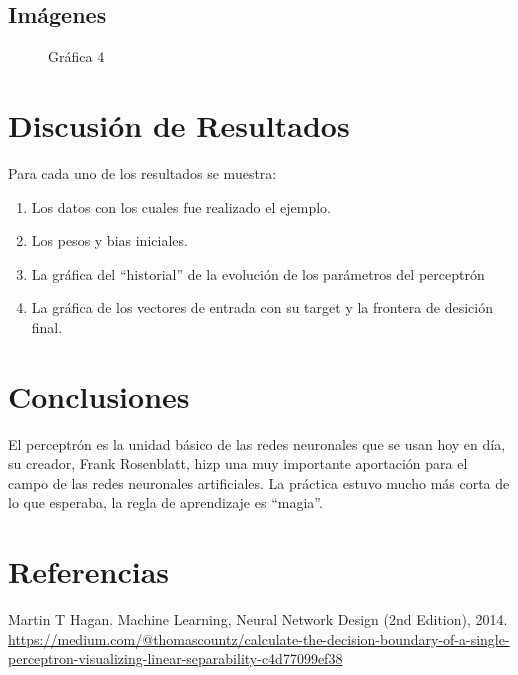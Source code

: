 \documentclass{article}
\begin{document}
\subsection{Imágenes}
\begin{figure}[htpb]
	\centering
	
	\caption{Gráfica 4}
\end{figure}

\section{Discusión de Resultados}
Para cada uno de los resultados se muestra:
\begin{enumerate}
	\item Los datos con los cuales fue realizado el ejemplo.
	\item Los pesos y bias iniciales.
	\item La gráfica del ``historial'' de la evolución de los parámetros del perceptrón
	\item La gráfica de los vectores de entrada con su target y la frontera de desición final.
\end{enumerate}
\section{Conclusiones}
El perceptrón es la unidad básico de las redes neuronales que se usan hoy en día, su creador,  Frank Rosenblatt,  hizp una muy importante aportación para el campo de las redes neuronales artificiales. 
La práctica estuvo mucho más corta de lo que esperaba, la regla de aprendizaje es ``magia''. 
\section{Referencias}
Martin T Hagan. Machine Learning, Neural Network Design (2nd Edition), 2014.\\
\url{https://medium.com/@thomascountz/calculate-the-decision-boundary-of-a-single-perceptron-visualizing-linear-separability-c4d77099ef38}
\end{document}
